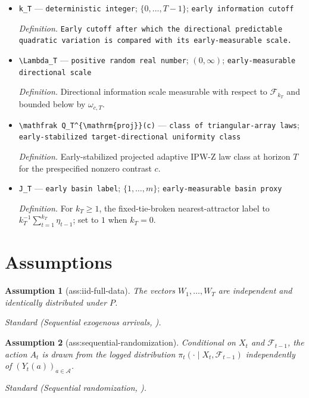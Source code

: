\documentclass{article}
\newtheorem{assumption}{Assumption}
\begin{document}
\begin{itemize}
  \item \texttt{k\_\allowbreak{}T} --- \texttt{deterministic integer}; \(\{0,\ldots,T-1\}\); \texttt{early information cutoff}
  \par\smallskip\noindent\emph{Definition.} \texttt{Early cutoff after which the directional predictable quadratic variation is compared with its early-\allowbreak{}measurable scale.}
  \item \texttt{\textbackslash{}\allowbreak{}Lambda\_\allowbreak{}T} --- \texttt{positive random real number}; \((0,\infty)\); \texttt{early-\allowbreak{}measurable directional scale}
  \par\smallskip\noindent\emph{Definition.} Directional information scale measurable with respect to \(\mathcal F_{k_T}\) and bounded below by \(\omega_{c,T}\).
  \item \texttt{\textbackslash{}\allowbreak{}mathfrak Q\_\allowbreak{}T\textasciicircum{}\{\textbackslash{}\allowbreak{}mathrm\{proj\}\allowbreak{}\}\allowbreak{}(c)} --- \texttt{class of triangular-\allowbreak{}array laws}; \texttt{early-\allowbreak{}stabilized target-\allowbreak{}directional uniformity class}
  \par\smallskip\noindent\emph{Definition.} Early-stabilized projected adaptive IPW-Z law class at horizon \(T\) for the prespecified nonzero contrast \(c\).
  \item \texttt{J\_\allowbreak{}T} --- \texttt{early basin label}; \(\{1,\ldots,m\}\); \texttt{early-\allowbreak{}measurable basin proxy}
  \par\smallskip\noindent\emph{Definition.} For \(k_T\ge1\), the fixed-tie-broken nearest-attractor label to \(k_T^{-1}\sum_{t=1}^{k_T}\eta_{t-1}\); set to \(1\) when \(k_T=0\).
\end{itemize}

\section{Assumptions}

\begin{assumption}[ass:iid-full-data]\label{ass:iid-full-data}
The vectors \(W_1,\ldots,W_T\) are independent and identically distributed under \(P\).
\par\smallskip\noindent\emph{Standard} (Sequential exogenous arrivals, \cite{GuoXu2026MisspecifiedBandits}).
\end{assumption}

\begin{assumption}[ass:sequential-randomization]\label{ass:sequential-randomization}
Conditional on \(X_t\) and \(\mathcal F_{t-1}\), the action \(A_t\) is drawn from the logged distribution \(\pi_t(\cdot\mid X_t,\mathcal F_{t-1})\) independently of \((Y_t(a))_{a\in\mathcal A}\).
\par\smallskip\noindent\emph{Standard} (Sequential randomization, \cite{QianEtAl2022MRT}).
\end{assumption}
\end{document}
